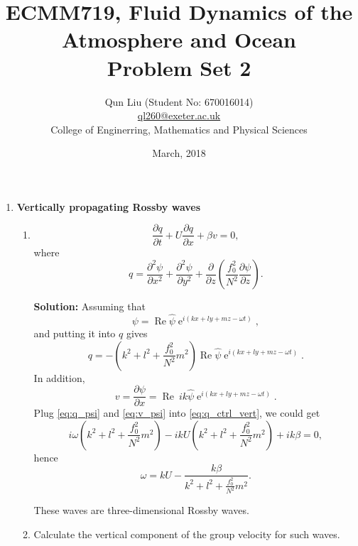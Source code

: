 \documentclass[a4paper]{article}
\title{ECMM719, Fluid Dynamics of the Atmosphere and Ocean\\
\textbf{Problem Set 2}}
\author{Qun Liu (Student No: 670016014)\\ \href{ql260@exeter.ac.uk}{ql260@exeter.ac.uk}
\\College of Enginerring, Mathematics and Physical Sciences}
\date{March, 2018}
\begin{document}
\maketitle

\begin{enumerate}[label=\textbf{\arabic*.}]
	\setcounter{enumi}{0}
	\item \textbf{Vertically propagating Rossby waves}
		\begin{enumerate}[label=\textbf{(\alph*)}]
			\setcounter{enumii}{0}
			\item 
			\begin{equation}\label{eq:q_ctrl_vert}
				\frac{\partial q}{\partial t}+U\frac{\partial q}{\partial x}+\beta v=0,
			\end{equation}
			where $$q=\frac{\partial ^2 \psi}{\partial x^2}+\frac{\partial ^2\psi}{\partial y^2}+\frac{\partial }{\partial z}\left(\frac{f_0^2}{N^2}\frac{\partial \psi}{\partial z}\right).$$
			
			\textbf{Solution:}
			Assuming that
			$$\psi = \operatorname{Re}\hat{\psi}\operatorname{e}^{i(kx+ly+mz-\omega t)},$$
			and putting it into $q$ gives %
			\begin{equation}\label{eq:q_psi}
				q= -\left(k^2+l^2+\frac{f_0^2}{N^2}m^2\right)\operatorname{Re}\hat{\psi}\operatorname{e}^{i(kx+ly+mz-\omega t)}.
			\end{equation}
			In addition, 
			\begin{equation}\label{eq:v_psi}
				v=\frac{\partial \psi}{\partial x}=\operatorname{Re}~ik\hat{\psi}\operatorname{e}^{i(kx+ly+mz-\omega t)}.
			\end{equation}
			Plug \eqref{eq:q_psi} and \eqref{eq:v_psi} into \eqref{eq:q_ctrl_vert}, we could get
			$$i\omega\left(k^2+l^2+\frac{f_0^2}{N^2}m^2\right)-ikU\left(k^2+l^2+\frac{f_0^2}{N^2}m^2\right)+ik\beta=0,$$
			hence
			\begin{equation}\label{eq:dispersion}
				\omega = kU-\frac{k\beta}{k^2+l^2+\frac{f_0^2}{N^2}m^2}.
			\end{equation}
			
			These waves are three-dimensional Rossby waves.\\
			
			\item Calculate the vertical component of the group velocity for such waves.
		

\end{enumerate}
\end{enumerate}
\end{document}
